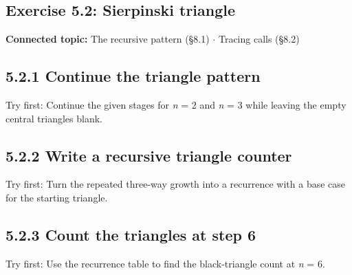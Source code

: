 \documentclass[11pt]{article}
\begin{document}
\begin{keepsection}
\section{Exercise 5.2: Sierpinski triangle}

\textbf{Connected topic:} The recursive pattern (§8.1) \ensuremath{\cdot} Tracing calls (§8.2)

\begin{keepsection}
\subsection{5.2.1 Continue the triangle pattern}

Try first: Continue the given stages for \textit{n} = 2 and \textit{n} = 3 while leaving the empty central triangles blank.

\end{keepsection}

\begin{keepsection}
\subsection{5.2.2 Write a recursive triangle counter}

Try first: Turn the repeated three-way growth into a recurrence with a base case for the starting triangle.

\end{keepsection}

\begin{keepsection}
\subsection{5.2.3 Count the triangles at step 6}

Try first: Use the recurrence table to find the black-triangle count at \textit{n} = 6.

\end{keepsection}
\end{keepsection}
\end{document}
